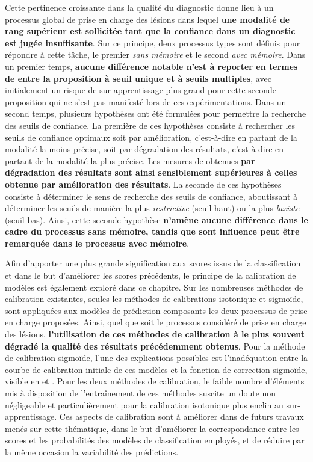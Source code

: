 Cette pertinence croissante dans la qualité du diagnostic donne lieu à un processus global de prise en charge des lésions dans lequel \textbf{une modalité de rang supérieur est sollicitée tant que la confiance dans un diagnostic est jugée insuffisante}. Sur ce principe, deux processus types sont définis pour répondre à cette tâche, le premier \textit{sans mémoire} et le second \textit{avec mémoire}. Dans un premier temps, \textbf{aucune différence notable n'est à reporter en termes de \fscore{} entre la proposition à seuil unique et à seuils multiples}, avec initialement un risque de sur-apprentissage plus grand pour cette seconde proposition qui ne s'est pas manifesté lors de ces expérimentations. Dans un second temps, plusieurs hypothèses ont été formulées pour permettre la recherche des seuils de confiance. La première de ces hypothèses consiste à rechercher les seuils de confiance optimaux soit par amélioration, c'est-à-dire en partant de la modalité la moins précise, soit par dégradation des résultats, c'est à dire en partant de la modalité la plus précise. Les mesures de \fscore{} obtenues \textbf{par dégradation des résultats sont ainsi sensiblement supérieures à celles obtenue par amélioration des résultats}. La seconde de ces hypothèses consiste à déterminer le sens de recherche des seuils de confiance, aboutissant à déterminer les seuils de manière la plus \textit{restrictive} (seuil haut) ou la plus \textit{laxiste} (seuil bas). Ainsi, cette seconde hypothèse \textbf{n'amène aucune différence dans le cadre du processus sans mémoire, tandis que sont influence peut être remarquée dans le processus avec mémoire}.\par

Afin d'apporter une plus grande signification aux scores issus de la classification et dans le but d'améliorer les scores précédents, le principe de la calibration de modèles est également exploré dans ce chapitre. Sur les nombreuses méthodes de calibration existantes, seules les méthodes de calibrations isotonique et sigmoïde, sont appliquées aux modèles de prédiction composants les deux processus de prise en charge proposées. Ainsi, quel que soit le processus considéré de prise en charge des lésions, \textbf{l'utilisation de ces méthodes de calibration à le plus souvent dégradé la qualité des résultats précédemment obtenus}. Pour la méthode de calibration sigmoïde, l'une des explications possibles est l'inadéquation entre la courbe de calibration initiale de ces modèles et la fonction de correction sigmoïde, visible en  et . Pour les deux méthodes de calibration, le faible nombre d'éléments mis à disposition de l'entraînement de ces méthodes suscite un doute non négligeable et particulièrement pour la calibration isotonique plus enclin au sur-apprentissage. Ces aspects de calibration sont à améliorer dans de futurs travaux menés sur cette thématique, dans le but d'améliorer la correspondance entre les scores et les probabilités des modèles de classification employés, et de réduire par la même occasion la variabilité des prédictions.\par
\clearpage

